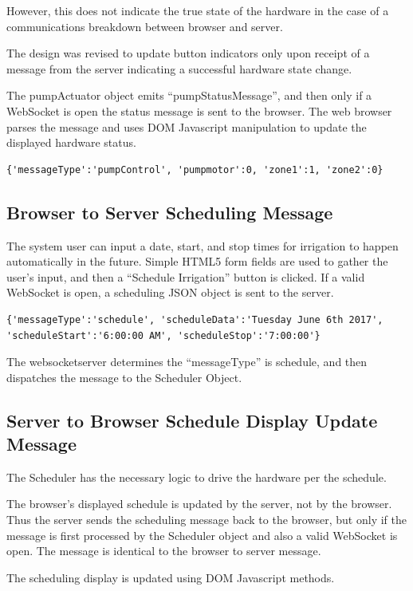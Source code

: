 However, this does not indicate the true state of the hardware in the case of a 
communications breakdown between browser and server.

The design was revised to update button indicators only upon receipt of a 
message from the server indicating a successful hardware state change.

The pumpActuator object emits ``pumpStatusMessage'', and then only if a 
WebSocket is open the status message is sent to the browser.  The web browser 
parses the message and uses DOM Javascript manipulation to update the displayed 
hardware status.

\begin{verbatim}
{'messageType':'pumpControl', 'pumpmotor':0, 'zone1':1, 'zone2':0}
\end{verbatim}

\subsection{Browser to Server Scheduling Message}

The system user can input a date, start, and stop times for irrigation to 
happen automatically in the future.  Simple HTML5 form fields are used to 
gather the user's input, and then a ``Schedule Irrigation'' button is clicked.  
If a valid WebSocket is open, a scheduling JSON object is sent to the server.

\begin{verbatim}
{'messageType':'schedule', 'scheduleData':'Tuesday June 6th 2017',
'scheduleStart':'6:00:00 AM', 'scheduleStop':'7:00:00'}
\end{verbatim}

The websocketserver determines the ``messageType'' is schedule, and then 
dispatches the message to the Scheduler Object.  

\subsection{Server to Browser Schedule Display Update Message}

The Scheduler has the necessary logic to drive the hardware per the schedule.

The browser's displayed schedule is updated by the server, not by the browser.  
Thus the server sends the scheduling message back to the browser, but only if 
the message is first processed by the Scheduler object and also a valid 
WebSocket is open.  The message is identical to the browser to server message.

The scheduling display is updated using DOM Javascript methods.